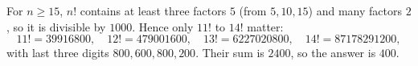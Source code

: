 For $n\ge15$, $n!$ contains at least three factors $5$ (from $5,10,15$) and many factors $2$, so it is divisible by $1000$. Hence only $11!$ to $14!$ matter:
\[11!=39916800,\quad12!=479001600,\quad13!=6227020800,\quad14!=87178291200,\]
with last three digits $800,600,800,200$. Their sum is $2400$, so the answer is $\boxed{400}$.
